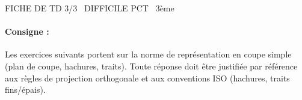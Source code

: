 \documentclass[11pt]{article}
\begin{document}
\begin{tcolorbox}[enhanced,colback=popink,colframe=popink,arc=10pt,boxrule=0pt,left=12pt,right=12pt,top=9pt,bottom=9pt]
{\color{white}\popxbold\small FICHE DE TD 3/3 \textbullet\ DIFFICILE \hfill PCT \textbullet\ 3ème\par}
\end{tcolorbox}
\vspace{4pt}
\paragraph{Consigne :} Les exercices suivants portent sur la norme de représentation en coupe simple (plan de coupe, hachures, traits). Toute réponse doit être justifiée par référence aux règles de projection orthogonale et aux conventions ISO (hachures, traits fins/épais).
\end{document}

